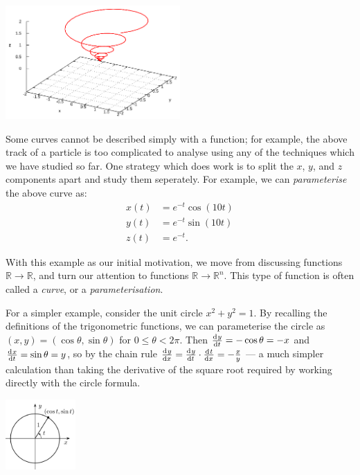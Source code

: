 


\begin{center}
  \includegraphics[width=0.5\textwidth]{space-curve-4}
\end{center}
Some curves cannot be described simply with a function; for example, the above track of a particle is
too complicated to analyse using any of the techniques which we have studied so far. One strategy which
does work is to split the $ x $, $ y $, and $ z $ components apart and study them seperately. For
example, we can \textit{parameterise} the above curve as:
\begin{align*}
  x(t) &= e^{-t} \cos(10t)\\
  y(t) &= e^{-t} \sin(10t)\\
  z(t) &= e^{-t}.
\end{align*}

With this example as our initial motivation, we move from discussing functions $ \mathbb{R} \rightarrow \mathbb{R} $, and turn our attention to
functions $ \mathbb{R} \rightarrow \mathbb{R}^n $. This type of function is often called a \textit{curve}, or a \textit{parameterisation}.

For a simpler example, consider the unit circle $ x^2 + y^2 = 1 $. By recalling the definitions
of the trigonometric functions, we can parameterise the circle as $ (x, y) = (\cos \theta, \sin \theta) $
for $ 0 \leq \theta < 2\pi $. Then $ \od{y}{t} = -\cos \theta = -x $ and $ \od{x}{t} = \sin \theta = y $,
so by the chain rule $ \od{y}{x} = \od{y}{t} \cdot \od{t}{x} = -\frac{x}{y} $ --- a much simpler calculation
than taking the derivative of the square root required by working directly with the circle formula.

\begin{center}
  \includegraphics[width=0.2\textwidth]{circle}
\end{center}

